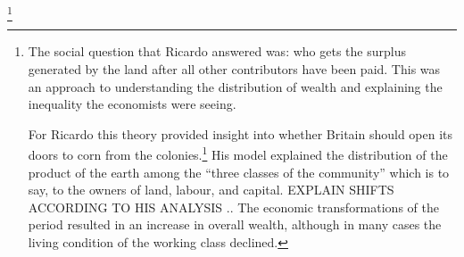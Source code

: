  \footnote{The social question that Ricardo answered was: who gets the surplus generated by the land after all other contributors have been paid. This was an approach to understanding the distribution of wealth and explaining the inequality the economists were seeing. 
 
 For Ricardo this theory provided insight into whether Britain should open its doors to corn from the colonies.\footnote{This was the debate over the Corn Laws (1794-1846), a set duties on grain imports into Britain to protect British agriculture from outside competition. In Britain, ``corn'' was the generic name for cereal crops. The full title of Ricardo's essay was was \textit{An Essay on the Influence of a low Price of Corn on the Profits of Stock, showing the Inexpediency of Restrictions on Importation: With Remarks on Mr Malthus' Two Last Publications: "An Inquiry into the Nature and Progress of Rent," and "The Grounds of an Opinion on the Policy of restricting the Importation of Foreign Corn"}.}
His model  explained the distribution of the product of the earth among the “three classes of the community” which is to say, to the owners of land, labour, and capital.   EXPLAIN SHIFTS  ACCORDING TO HIS ANALYSIS .. The economic transformations of the period resulted in an increase in overall wealth, although in many cases the living condition of the working class declined.} %

 

